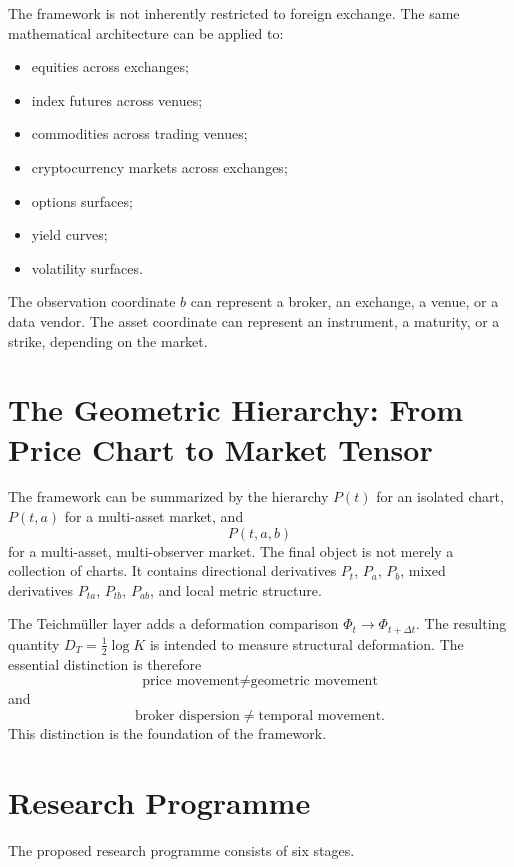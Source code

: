 \documentclass[11pt,a4paper]{article}
\numberwithin{equation}{section}
\begin{document}
The framework is not inherently restricted to foreign exchange. The
same mathematical architecture can be applied to:
\begin{itemize}
\item equities across exchanges;
\item index futures across venues;
\item commodities across trading venues;
\item cryptocurrency markets across exchanges;
\item options surfaces;
\item yield curves;
\item volatility surfaces.
\end{itemize}
The observation coordinate $b$ can represent a broker, an exchange,
a venue, or a data vendor. The asset coordinate can represent an
instrument, a maturity, or a strike, depending on the market.

\section{The Geometric Hierarchy: From Price Chart to Market Tensor}

The framework can be summarized by the hierarchy $P(t)$ for an
isolated chart, $P(t,a)$ for a multi-asset market, and
\[
\boxed{P(t,a,b)}
\]
for a multi-asset, multi-observer market. The final object is not
merely a collection of charts. It contains directional derivatives
$P_t$, $P_a$, $P_b$, mixed derivatives $P_{ta}$, $P_{tb}$, $P_{ab}$,
and local metric structure.

The Teichmüller layer adds a deformation comparison
$\Phi_t\rightarrow\Phi_{t+\Delta t}$. The resulting quantity
$D_T=\frac12\log K$ is intended to measure structural deformation.
The essential distinction is therefore
\[
\boxed{\text{price movement}\neq\text{geometric movement}}
\]
and
\[
\boxed{\text{broker dispersion}\neq\text{temporal movement}.}
\]
This distinction is the foundation of the framework.

\section{Research Programme}

The proposed research programme consists of six stages.
\end{document}
